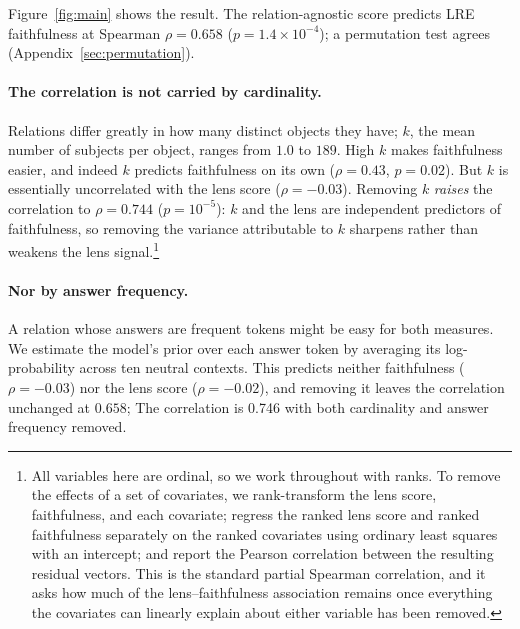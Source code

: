 \documentclass[11pt]{article}
\begin{document}

Figure~\ref{fig:main} shows the result. The relation-agnostic score
predicts LRE faithfulness at Spearman $\rho = 0.658$
($p = 1.4\!\times\!10^{-4}$); a permutation test agrees
(Appendix~\ref{sec:permutation}).

\paragraph{The correlation is not carried by cardinality.} Relations
differ greatly in how many distinct objects they have; $k$, the mean number
of subjects per object, ranges from $1.0$ to $189$. High $k$ makes
faithfulness easier, and indeed $k$ predicts faithfulness on its own
($\rho = 0.43$, $p = 0.02$). But $k$ is essentially uncorrelated with the
lens score ($\rho = -0.03$). Removing $k$  \emph{raises} the
correlation to $\rho = 0.744$ ($p = 10^{-5}$): $k$ and the lens are
independent predictors of faithfulness, so removing the variance
attributable to $k$ sharpens rather than weakens the lens
signal.\footnote{All variables here are ordinal, so we work throughout with
ranks. To remove the effects of a set of covariates, we
rank-transform the lens score, faithfulness, and each
covariate; regress the ranked lens score and ranked
faithfulness separately on the ranked covariates using
ordinary least squares with an intercept; and report the
Pearson correlation between the resulting residual vectors.
This is the standard partial
Spearman correlation, and it asks how much of the lens--faithfulness
association remains once everything the covariates can linearly explain
about either variable has been removed.}


\paragraph{Nor by answer frequency.} A relation whose answers are frequent
tokens might be easy for both measures. We estimate the model's prior over
each answer token by averaging its log-probability across ten neutral
contexts. This predicts neither faithfulness ($\rho = -0.03$) nor the lens
score ($\rho = -0.02$), and removing it  leaves the correlation
unchanged at $0.658$;
The correlation is 0.746 with both cardinality and answer
frequency removed.
\end{document}
